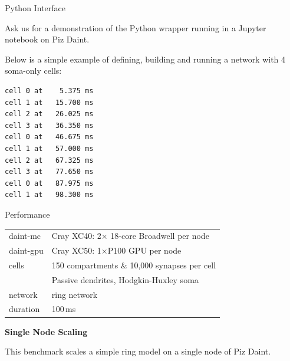 \documentclass[a0paper,portrait]{baposter}
\newcommand{\imageheader}[1]{\begin{center}\bfseries\large{#1}\end{center} \vspace{-2pt}}
\begin{document}
\begin{poster}
\begin{posterbox}[name=python,column=1,below=motivation,span=1]{Python Interface}
    \vspace{-2pt}
    \begin{center}
    \colorbox{yellow!20}{
        \begin{minipage}{0.8\textwidth}
            \centering
        Ask us for a demonstration of the Python wrapper running in a Jupyter notebook on Piz Daint.
        \end{minipage}
    }
    \end{center}

    \vspace{2pt}

    Below is a simple example of defining, building and running a network with 4 soma-only cells:

    \vspace{2pt}



\vspace{0pt}

\begin{lstlisting}[style=PosterOutput]
cell 0 at    5.375 ms
cell 1 at   15.700 ms
cell 2 at   26.025 ms
cell 3 at   36.350 ms
cell 0 at   46.675 ms
cell 1 at   57.000 ms
cell 2 at   67.325 ms
cell 3 at   77.650 ms
cell 0 at   87.975 ms
cell 1 at   98.300 ms
\end{lstlisting}
\vspace{-4pt}

\end{posterbox}



\begin{posterbox}[name=plots,column=2,row=0,span=1]{Performance}
    {
        \tiny
        \colorbox[HTML]{FCF3CF}{%
            \begin{tabularx}{0.95\textwidth}{l|X}
          daint-mc  & Cray XC40: 2$\times$ 18-core Broadwell per node\smallskip\\
          daint-gpu & Cray XC50: 1$\times$P100 GPU per node\smallskip\\
              cells & 150 compartments \& 10,000 synapses per cell\\
                    & Passive dendrites, Hodgkin-Huxley soma\smallskip\\
            network & ring network\smallskip\\
           duration & 100\,ms\\
            \end{tabularx}
        }
    }
    \vskip4pt
    \imageheader{Single Node Scaling}
    \vspace{-5pt}
    { \small
        This benchmark scales a simple ring model on a single node of Piz Daint.
    }
    \vskip8pt
    


\end{posterbox}
\end{poster}
\end{document}
